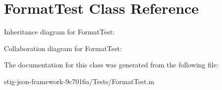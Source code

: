 \hypertarget{interface_format_test}{
\section{\-Format\-Test \-Class \-Reference}
\label{interface_format_test}
}


\-Inheritance diagram for \-Format\-Test\-:


\-Collaboration diagram for \-Format\-Test\-:


\-The documentation for this class was generated from the following file\-:\begin{DoxyCompactItemize}
\item 
stig-\/json-\/framework-\/9c7016a/\-Tests/\-Format\-Test.\-m\end{DoxyCompactItemize}
